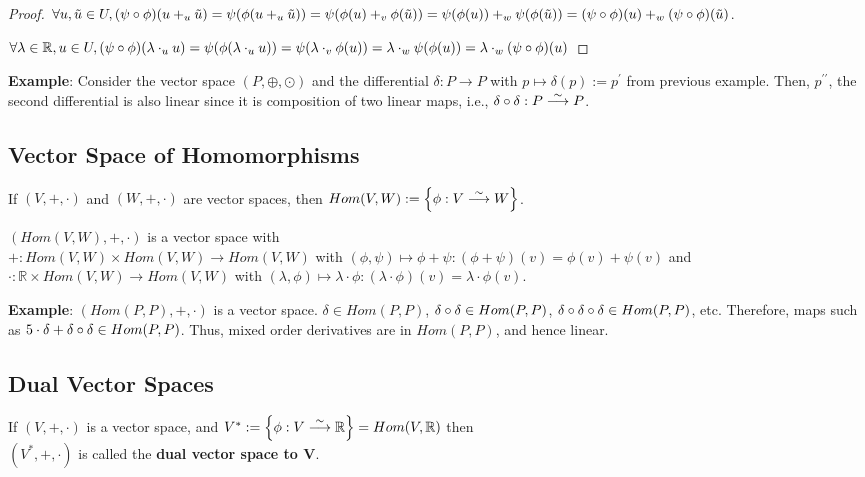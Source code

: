 \begin{proof}
$ \forall u, \tilde{u} \in U, (\psi \circ \phi)(u +_u \tilde{u}) = \psi(\phi(u +_u \tilde{u})) = \psi(\phi(u) +_v \phi(\tilde{u})) = \psi(\phi(u)) +_w \psi(\phi(\tilde{u})) = (\psi \circ \phi)(u) +_w (\psi \circ \phi)(\tilde{u}) $.

$ \forall \lambda \in \mathbb{R}, u \in U, (\psi \circ \phi)(\lambda \cdot_u u) = \psi(\phi(\lambda \cdot_u u)) = \psi(\lambda \cdot_v \phi(u)) = \lambda \cdot_w \psi(\phi(u)) = \lambda \cdot_w (\psi \circ \phi)(u) $
\end{proof}

\textbf{Example}: Consider the vector space $(P,\oplus,\odot)$ and the differential $\delta : P \to P$ with $p \mapsto \delta (p) := p^\prime$ from previous example. Then, $p^{\prime\prime}$, the second differential is also linear since it is composition of two linear maps, i.e., $\delta \circ \delta : P \stackrel{\sim}{\longrightarrow} P$.

\subsection{Vector Space of Homomorphisms}
\begin{definition}
If $(V, +, \cdot)$ and $(W, +, \cdot)$ are vector spaces, then $Hom(V,W) := \left\lbrace \phi : V \stackrel{\sim}{\longrightarrow} W \right\rbrace$.
\end{definition}

\begin{theorem}
$(Hom(V,W),+,\cdot)$ is a vector space with \\
$+ : Hom(V,W) \times Hom(V,W) \to Hom(V,W)$ with $(\phi,\psi) \mapsto \phi + \psi : (\phi + \psi)(v) = \phi(v) + \psi(v)$ and \\
$\cdot : \mathbb{R} \times Hom(V,W) \to Hom(V,W)$ with $(\lambda,\phi) \mapsto \lambda \cdot \phi : (\lambda \cdot \phi)(v) = \lambda \cdot \phi(v)$.
\end{theorem}

\textbf{Example}: $(Hom(P,P),+,\cdot)$ is a vector space. $\delta \in Hom(P,P)$, $\delta \circ \delta \in Hom(P,P)$, $\delta \circ \delta \circ \delta \in Hom(P,P)$, etc. Therefore, maps such as $5 \cdot \delta + \delta \circ \delta \in Hom(P,P)$. Thus, mixed order derivatives are in $Hom(P,P)$, and hence linear.

\subsection{Dual Vector Spaces}
\begin{definition}
If $(V, +, \cdot)$ is a vector space, and $V^{\ast} := \left\lbrace \phi : V \stackrel{\sim}{\longrightarrow} \mathbb{R} \right\rbrace = Hom(V,\mathbb{R})$ then \\
$(V^{\ast},+,\cdot)$ is called the \textbf{dual vector space to V}.
\end{definition}

